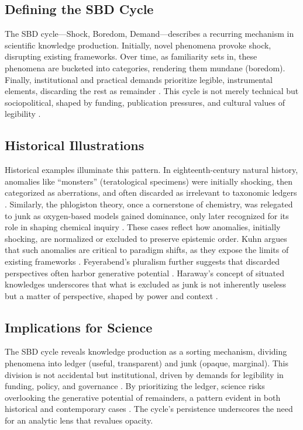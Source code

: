 \documentclass[12pt]{article}
\begin{document}
\subsection{Defining the SBD Cycle}
The SBD cycle---Shock, Boredom, Demand---describes a recurring mechanism in scientific knowledge production. Initially, novel phenomena provoke shock, disrupting existing frameworks. Over time, as familiarity sets in, these phenomena are bucketed into categories, rendering them mundane (boredom). Finally, institutional and practical demands prioritize legible, instrumental elements, discarding the rest as remainder \citep{latour1987}. This cycle is not merely technical but sociopolitical, shaped by funding, publication pressures, and cultural values of legibility \citep{jasanoff2004}.

\subsection{Historical Illustrations}
Historical examples illuminate this pattern. In eighteenth-century natural history, anomalies like ``monsters'' (teratological specimens) were initially shocking, then categorized as aberrations, and often discarded as irrelevant to taxonomic ledgers \citep{daston1998}. Similarly, the phlogiston theory, once a cornerstone of chemistry, was relegated to junk as oxygen-based models gained dominance, only later recognized for its role in shaping chemical inquiry \citep{kuhn1962}. These cases reflect how anomalies, initially shocking, are normalized or excluded to preserve epistemic order. Kuhn argues that such anomalies are critical to paradigm shifts, as they expose the limits of existing frameworks \citep{kuhn1962}. Feyerabend’s pluralism further suggests that discarded perspectives often harbor generative potential \citep{feyerabend1975}. Haraway’s concept of situated knowledges underscores that what is excluded as junk is not inherently useless but a matter of perspective, shaped by power and context \citep{haraway1988}.

\subsection{Implications for Science}
The SBD cycle reveals knowledge production as a sorting mechanism, dividing phenomena into ledger (useful, transparent) and junk (opaque, marginal). This division is not accidental but institutional, driven by demands for legibility in funding, policy, and governance \citep{scott1998}. By prioritizing the ledger, science risks overlooking the generative potential of remainders, a pattern evident in both historical and contemporary cases \citep{rheinberger1997}. The cycle’s persistence underscores the need for an analytic lens that revalues opacity.
\end{document}
